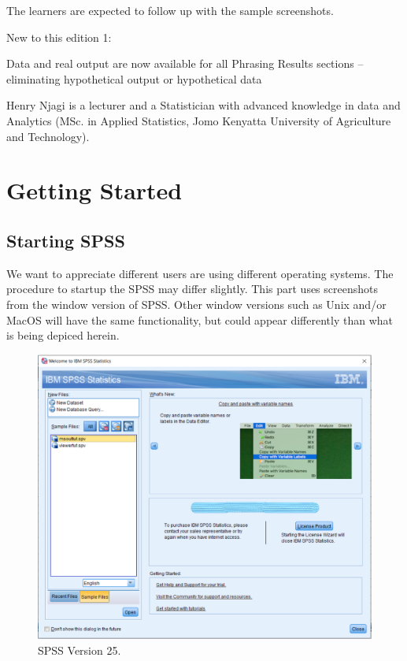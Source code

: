\documentclass[
]{book}
\begin{document}
The learners are expected to follow up with the sample screenshots.

New to this edition 1:

Data and real output are now available for all Phrasing Results sections -- eliminating hypothetical output or hypothetical data

Henry Njagi is a lecturer and a Statistician with advanced knowledge in data and Analytics (MSc. in Applied Statistics, Jomo Kenyatta University of Agriculture and Technology).

\hypertarget{getting-started}{%
\chapter{Getting Started}\label{getting-started}}

\hypertarget{starting-spss}{%
\section{Starting SPSS}\label{starting-spss}}

We want to appreciate different users are using different operating systems. The procedure to startup the SPSS may differ slightly.
This part uses screenshots from the window version of SPSS. Other window versions such as Unix and/or MacOS will have the same functionality, but could appear differently than what is being depiced herein.

\begin{figure}
\centering
\includegraphics{getstarted.png}
\caption{SPSS Version 25.}
\end{figure}
\end{document}
